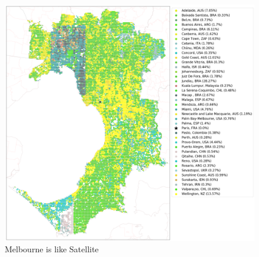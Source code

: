 \documentclass[final,3p,times,authoryear]{elsarticle}
\begin{document}
\begin{figure}[!htbp]
\includegraphics[scale=0.25]{Images/MelbourneOverallAbrev_sat.png} 
\caption{Melbourne is like Satellite}    
 \label{fig:melmaps}  
\end{figure} 

\end{document}
